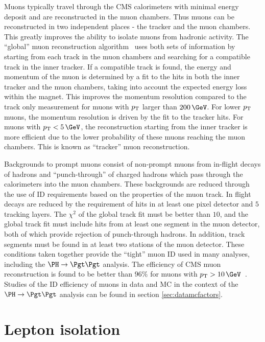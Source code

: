 Muons typically travel through the CMS calorimeters with minimal energy deposit
and are reconstructed in the muon chambers. Thus muons can be reconstructed
in two independent places - the tracker and the muon chambers. This
greatly improves the ability to isolate muons from hadronic activity. The
``global'' muon reconstruction algorithm~\cite{MuonReco} uses both sets of information by
starting from each track in the muon chambers and searching for a compatible
track in the inner tracker. If a compatible track is found, the energy and
momentum of the muon is determined by a fit to the hits in both the inner
tracker and the muon chambers, taking into account the expected energy loss
within the magnet. This improves the momentum resolution compared to
the track only measurement for muons with $p_{\mathrm{T}}$ larger than $200\,\GeV$. For
lower $p_{\mathrm{T}}$ muons, the momentum resolution is driven by the fit to the tracker
hits. For muons with $\pt < 5\,\GeV$, the reconstruction starting from the inner
tracker is more efficient due to the lower probability of these muons reaching
the muon chambers. This is known as ``tracker'' muon reconstruction.  

Backgrounds to prompt muons consist of non-prompt muons from in-flight decays of
hadrons and ``punch-through'' of charged hadrons which pass through the calorimeters
into the muon chambers. These backgrounds are reduced through the use of ID
requirements based on the properties of the muon track. In flight decays are
reduced by the requirement of hits in at least one pixel detector and $5$
tracking layers. The $\chi^{2}$ of the global track fit must be better than
$10$, and the global track fit must include hits from at least one segment in
the muon detector, both of which provide rejection of punch-through hadrons. In
addition, track segments must be found in at least two stations of the muon
detector. These conditions taken together provide the ``tight'' muon ID used in
many analyses, including the $\PH\to\Pgt\Pgt$ analysis.
The efficiency of CMS muon reconstruction is found to be better
than $96\%$ for muons with $\pt > 10\,\GeV$~\cite{MuonReco}. Studies of the ID efficiency of
muons in data and \ac{MC} in the context of the $\PH \to \Pgt\Pgt$ analysis can
be found in section \ref{sec:datamcfactors}.

\section{Lepton isolation}
\label{sec:leptonisolation}

